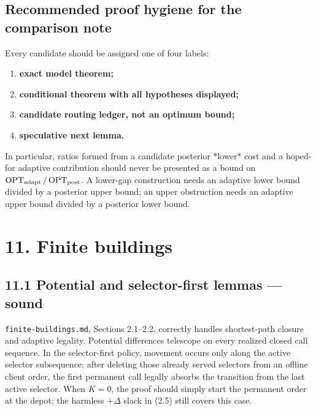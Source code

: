 \documentclass[11pt,a4paper]{article}
\begin{document}
\subsection*{Recommended proof hygiene for the comparison note}

Every candidate should be assigned one of four labels:


\begin{enumerate}

\item \textbf{exact model theorem;}

\item \textbf{conditional theorem with all hypotheses displayed;}

\item \textbf{candidate routing ledger, not an optimum bound;}

\item \textbf{speculative next lemma.}

\end{enumerate}

In particular, ratios formed from a candidate posterior *lower* cost and a hoped-for adaptive contribution should never be presented as a bound on \(\operatorname{OPT}_{\rm adapt}/\operatorname{OPT}_{\rm post}\).  A lower-gap construction needs an adaptive lower bound divided by a posterior upper bound; an upper obstruction needs an adaptive upper bound divided by a posterior lower bound.


\section*{11. Finite buildings}

\subsection*{11.1 Potential and selector-first lemmas — sound}

\nolinkurl{finite-buildings.md}, Sections 2.1–2.2, correctly handles shortest-path closure and adaptive legality.  Potential differences telescope on every realized closed call sequence.  In the selector-first policy, movement occurs only along the active selector subsequence; after deleting those already served selectors from an offline client order, the first permanent call legally absorbs the transition from the last active selector.  When \(K=0\), the proof should simply start the permanent order at the depot; the harmless \(+\Delta\) slack in (2.5) still covers this case.
\end{document}
